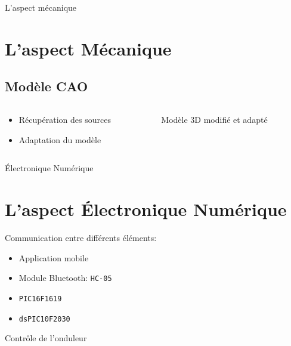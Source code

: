 \documentclass{beamer}
\begin{document}
	\begin{frame}{L'aspect mécanique}
		\section[Mécanique]{L'aspect Mécanique}
		\subsection{Modèle CAO}
		\begin{columns}[T]
	  		\begin{column}{0.5\textwidth}
		    	\begin{itemize}
		    		\item Récupération des sources
		    		\item Adaptation du modèle
		    	\end{itemize}
	  		\end{column}
	  		\begin{column}{0.5\textwidth}
	    		\begin{figure}
	    			\caption{Modèle 3D modifié et adapté}
	    		 \end{figure}
	  		\end{column}
		\end{columns}
		
	\end{frame}
	\begin{frame}{Électronique Numérique}
		\section[ENUM]{L'aspect Électronique Numérique}
		Communication entre différents éléments:
		\begin{itemize}
			\item Application mobile
	  		\item Module Bluetooth: \texttt{HC-05}
			\item \texttt{PIC16F1619}
			\item \texttt{dsPIC10F2030}
	  	\end{itemize}
	  	Contrôle de l'onduleur
	\end{frame}
\end{document}
